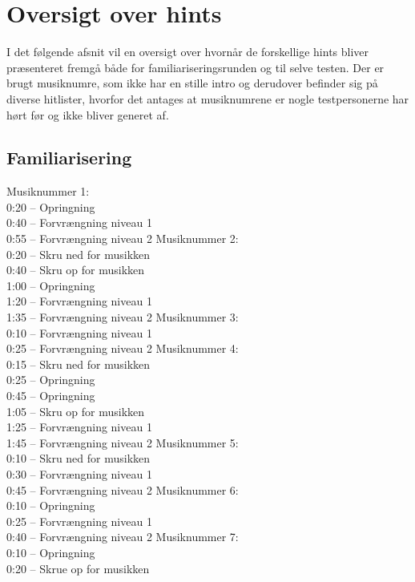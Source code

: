 \chapter{Oversigt over hints}
\label{app:OversigtHints}
%
I det følgende afsnit vil en oversigt over hvornår de forskellige hints bliver præsenteret fremgå både for familiariseringsrunden og til selve testen. Der er brugt musiknumre, som ikke har en stille intro og derudover befinder sig på diverse hitlister, hvorfor det antages at musiknumrene er nogle testpersonerne har hørt før og ikke bliver generet af. 

\section{Familiarisering}
Musiknummer 1:\\
0:20 – Opringning\\
0:40 – Forvrængning niveau 1\\
0:55 – Forvrængning niveau 2\blankline
%
Musiknummer 2:\\
0:20 – Skru ned for musikken\\
0:40 – Skru op for musikken\\
1:00 – Opringning\\
1:20 – Forvrængning niveau 1\\
1:35 – Forvrængning niveau 2\blankline
%
Musiknummer 3:\\
0:10 – Forvrængning niveau 1\\
0:25 – Forvrængning niveau 2\blankline
%
Musiknummer 4:\\
0:15 – Skru ned for musikken\\
0:25 – Opringning\\
0:45 – Opringning\\
1:05 – Skru op for musikken\\
1:25 – Forvrængning niveau 1\\
1:45 – Forvrængning niveau 2\blankline 
%
Musiknummer 5:\\
0:10 – Skru ned for musikken\\
0:30 – Forvrængning niveau 1\\
0:45 – Forvrængning niveau 2\blankline 
%
Musiknummer 6:\\
0:10 – Opringning\\
0:25 – Forvrængning niveau 1\\
0:40 – Forvrængning niveau 2\blankline
%
Musiknummer 7:\\
0:10 – Opringning\\
0:20 – Skrue op for musikken
%
